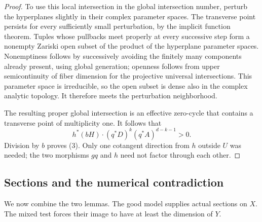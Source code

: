 \begin{proof}
To use this local intersection in the global intersection number,
perturb the hyperplanes slightly in their complex parameter spaces.
The transverse point persists for every sufficiently small
perturbation, by the implicit function theorem. Tuples whose
pullbacks meet properly at every successive step form a nonempty
Zariski open subset of the product of the hyperplane parameter
spaces. Nonemptiness follows by successively avoiding the finitely
many components already present, using global generation; openness
follows from upper semicontinuity of fiber dimension for the
projective universal intersections. This parameter space is
irreducible, so the open subset is dense also in the complex
analytic topology. It therefore meets the perturbation neighborhood.

The resulting proper global intersection is an effective zero-cycle
that contains a transverse point of multiplicity one. It follows that
\[
 h^*(bH)\cdot(q^*D)^k(q^*A)^{d-k-1}>0.
\]
Division by $b$ proves (3). Only one cotangent direction from $h$
outside $U$ was needed; the two morphisms $gq$ and $h$ need not
factor through each other.
\end{proof}

\subsection{Sections and the numerical contradiction}

We now combine the two lemmas. The good model supplies actual
sections on $X$. The mixed test forces their image to have at least
the dimension of $Y$.

